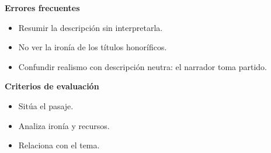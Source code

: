 \documentclass{book}
\begin{document}
\begin{tcolorbox}[title={Ejercicio resuelto}, studiumworked, breakable]
\noindent\textbf{Errores frecuentes}
\begin{itemize}
\item Resumir la descripción sin interpretarla.
\item No ver la ironía de los títulos honoríficos.
\item Confundir realismo con descripción neutra: el narrador toma partido.
\end{itemize}

\noindent\textbf{Criterios de evaluación}
\begin{itemize}
\item Sitúa el pasaje.
\item Analiza ironía y recursos.
\item Relaciona con el tema.
\end{itemize}
\end{tcolorbox}
\end{document}
